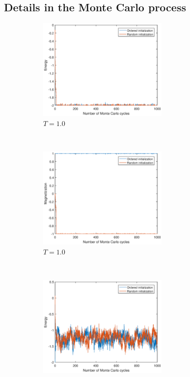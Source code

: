 \subsection{Details in the Monte Carlo process}\label{sec:detailresult}
\begin{figure}[tb]
	\begin{subfigure}[tb]{0.5\textwidth}
		\centering
		\includegraphics[width=0.7\textwidth]{Process_ene_lowT.eps}
		\caption{$T=1.0$}
	\end{subfigure}
	~
	\begin{subfigure}[tb]{0.5\textwidth}
		\centering
		\includegraphics[width=0.7\textwidth]{Process_mag_lowT.eps}		
		\caption{$T=1.0$}
	\end{subfigure}
	~
	\begin{subfigure}[tb]{0.5\textwidth}
		\centering
		\includegraphics[width=0.7\textwidth]{Process_ene_highT.eps}		

\end{subfigure}
\end{figure}
